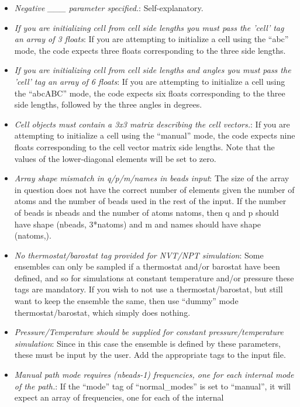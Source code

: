 \documentclass[11pt,english,fleqn]{report}
\begin{document}
\begin{itemize}
\item \emph{Negative \_\_\_ parameter specified.}: Self-explanatory.
\item \emph{If you are initializing cell from cell side lengths you must pass the 'cell' tag an array of 3 floats}:
If you are attempting to initialize a cell using the {}``abc'' mode,
the code expects three floats corresponding to the three side lengths.
\item \emph{If you are initializing cell from cell side lengths and angles you must pass the 'cell' tag an array of 6 floats}:
If you are attempting to initialize a cell using the {}``abcABC''
mode, the code expects six floats corresponding to the three side
lengths, followed by the three angles in degrees.
\item \emph{Cell objects must contain a 3x3 matrix describing the cell vectors.}:
If you are attempting to initialize a cell using the {}``manual''
mode, the code expects nine floats corresponding to the cell vector
matrix side lengths. Note that the values of the lower-diagonal elements
will be set to zero.
\item \emph{Array shape mismatch in q/p/m/names in beads input}: The size
of the array in question does not have the correct number of elements
given the number of atoms and the number of beads used in the rest
of the input. If the number of beads is nbeads and the number of atoms
natoms, then q and p should have shape (nbeads, 3{*}natoms) and m
and names should have shape (natoms,).
\item \emph{No thermostat/barostat tag provided for \emph{NVT}/\emph{NPT} simulation}:
Some ensembles can only be sampled if a thermostat and/or barostat
have been defined, and so for simulations at constant temperature
and/or pressure these tags are mandatory. If you wish to not use a
thermostat/barostat, but still want to keep the ensemble the same,
then use {}``dummy'' mode thermostat/barostat, which simply does
nothing.
\item \emph{Pressure/Temperature should be supplied for constant pressure/temperature simulation}:
Since in this case the ensemble is defined by these parameters, these
must be input by the user. Add the appropriate tags to the input file.
\item \emph{Manual path mode requires (nbeads-1) frequencies, one for each internal mode of the path.}:
If the {}``mode'' tag of {}``normal\_modes'' is set to {}``manual'',
it will expect an array of frequencies, one for each of the internal

\end{itemize}
\end{document}
